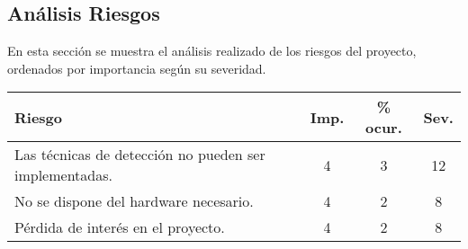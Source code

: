 \subsection*{Análisis Riesgos}
En esta sección se muestra el análisis realizado de los riesgos del proyecto, ordenados por importancia según su severidad. \\

\begin{tabular}{|l||c|c|c|}
	
	\hline
	Riesgo & Imp. & \% ocur. & Sev. \\
	\hline
	Las técnicas de detección no pueden ser implementadas.  & 4 & 3 & 12 \\
	No se dispone del hardware necesario. & 4 & 2 & 8 \\
	Pérdida de interés en el proyecto. & 4 & 2 & 8 \\
	\hline
	
\end{tabular}

